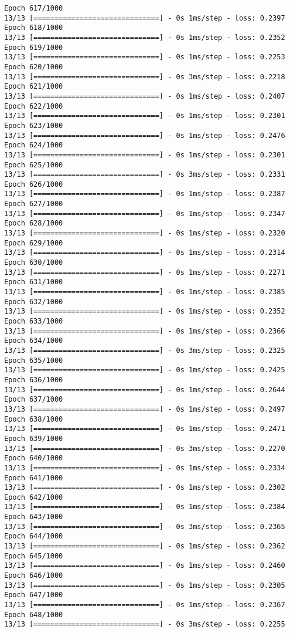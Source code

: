 \documentclass[11pt]{article}
\begin{document}
\begin{Verbatim}[commandchars=\\\{\}]
Epoch 617/1000
13/13 [==============================] - 0s 1ms/step - loss: 0.2397
Epoch 618/1000
13/13 [==============================] - 0s 1ms/step - loss: 0.2352
Epoch 619/1000
13/13 [==============================] - 0s 1ms/step - loss: 0.2253
Epoch 620/1000
13/13 [==============================] - 0s 3ms/step - loss: 0.2218
Epoch 621/1000
13/13 [==============================] - 0s 1ms/step - loss: 0.2407
Epoch 622/1000
13/13 [==============================] - 0s 1ms/step - loss: 0.2301
Epoch 623/1000
13/13 [==============================] - 0s 1ms/step - loss: 0.2476
Epoch 624/1000
13/13 [==============================] - 0s 1ms/step - loss: 0.2301
Epoch 625/1000
13/13 [==============================] - 0s 3ms/step - loss: 0.2331
Epoch 626/1000
13/13 [==============================] - 0s 1ms/step - loss: 0.2387
Epoch 627/1000
13/13 [==============================] - 0s 1ms/step - loss: 0.2347
Epoch 628/1000
13/13 [==============================] - 0s 1ms/step - loss: 0.2320
Epoch 629/1000
13/13 [==============================] - 0s 1ms/step - loss: 0.2314
Epoch 630/1000
13/13 [==============================] - 0s 1ms/step - loss: 0.2271
Epoch 631/1000
13/13 [==============================] - 0s 1ms/step - loss: 0.2385
Epoch 632/1000
13/13 [==============================] - 0s 1ms/step - loss: 0.2352
Epoch 633/1000
13/13 [==============================] - 0s 1ms/step - loss: 0.2366
Epoch 634/1000
13/13 [==============================] - 0s 3ms/step - loss: 0.2325
Epoch 635/1000
13/13 [==============================] - 0s 1ms/step - loss: 0.2425
Epoch 636/1000
13/13 [==============================] - 0s 1ms/step - loss: 0.2644
Epoch 637/1000
13/13 [==============================] - 0s 1ms/step - loss: 0.2497
Epoch 638/1000
13/13 [==============================] - 0s 1ms/step - loss: 0.2471
Epoch 639/1000
13/13 [==============================] - 0s 3ms/step - loss: 0.2270
Epoch 640/1000
13/13 [==============================] - 0s 1ms/step - loss: 0.2334
Epoch 641/1000
13/13 [==============================] - 0s 1ms/step - loss: 0.2302
Epoch 642/1000
13/13 [==============================] - 0s 1ms/step - loss: 0.2384
Epoch 643/1000
13/13 [==============================] - 0s 3ms/step - loss: 0.2365
Epoch 644/1000
13/13 [==============================] - 0s 1ms/step - loss: 0.2362
Epoch 645/1000
13/13 [==============================] - 0s 1ms/step - loss: 0.2460
Epoch 646/1000
13/13 [==============================] - 0s 1ms/step - loss: 0.2305
Epoch 647/1000
13/13 [==============================] - 0s 1ms/step - loss: 0.2367
Epoch 648/1000
13/13 [==============================] - 0s 3ms/step - loss: 0.2255

\end{Verbatim}
\end{document}
